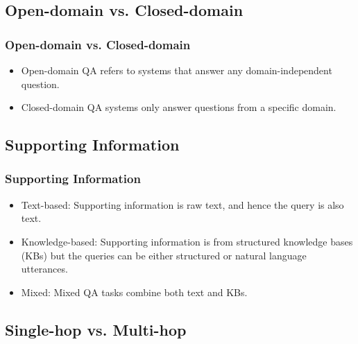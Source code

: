 \documentclass[]{beamer}
\begin{document}
\subsection{Open-domain vs. Closed-domain}
\begin{frame}
\frametitle{Open-domain vs. Closed-domain}

\begin{itemize}
\item Open-domain QA refers to systems that answer any domain-independent question.

\item Closed-domain QA systems only answer questions from a specific domain.

\end{itemize}
\end{frame}



\subsection{Supporting Information}
\begin{frame}
\frametitle{Supporting Information}

\begin{itemize}
\item%
Text-based: Supporting information is raw text, and hence the query is also text.


\item%
Knowledge-based: Supporting information is from structured knowledge bases (KBs) but the queries can be either structured or natural language utterances.

\item%
Mixed: Mixed QA tasks combine both text and KBs.

\end{itemize}

\end{frame}


\subsection{Single-hop vs. Multi-hop}
\end{document}
